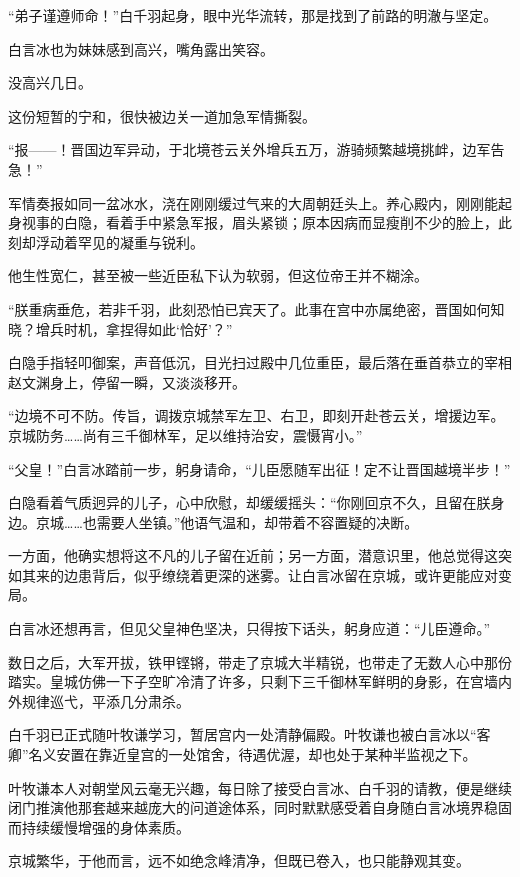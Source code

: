 “弟子谨遵师命！”白千羽起身，眼中光华流转，那是找到了前路的明澈与坚定。

白言冰也为妹妹感到高兴，嘴角露出笑容。

\vspace{2em}

没高兴几日。

这份短暂的宁和，很快被边关一道加急军情撕裂。

“报——！晋国边军异动，于北境苍云关外增兵五万，游骑频繁越境挑衅，边军告急！”

军情奏报如同一盆冰水，浇在刚刚缓过气来的大周朝廷头上。养心殿内，刚刚能起身视事的白隐，看着手中紧急军报，眉头紧锁；原本因病而显瘦削不少的脸上，此刻却浮动着罕见的凝重与锐利。

他生性宽仁，甚至被一些近臣私下认为软弱，但这位帝王并不糊涂。

“朕重病垂危，若非千羽，此刻恐怕已宾天了。此事在宫中亦属绝密，晋国如何知晓？增兵时机，拿捏得如此‘恰好’？”

白隐手指轻叩御案，声音低沉，目光扫过殿中几位重臣，最后落在垂首恭立的宰相赵文渊身上，停留一瞬，又淡淡移开。

“边境不可不防。传旨，调拨京城禁军左卫、右卫，即刻开赴苍云关，增援边军。京城防务……尚有三千御林军，足以维持治安，震慑宵小。”

“父皇！”白言冰踏前一步，躬身请命，“儿臣愿随军出征！定不让晋国越境半步！”

白隐看着气质迥异的儿子，心中欣慰，却缓缓摇头：“你刚回京不久，且留在朕身边。京城……也需要人坐镇。”他语气温和，却带着不容置疑的决断。

一方面，他确实想将这不凡的儿子留在近前；另一方面，潜意识里，他总觉得这突如其来的边患背后，似乎缭绕着更深的迷雾。让白言冰留在京城，或许更能应对变局。

白言冰还想再言，但见父皇神色坚决，只得按下话头，躬身应道：“儿臣遵命。”

数日之后，大军开拔，铁甲铿锵，带走了京城大半精锐，也带走了无数人心中那份踏实。皇城仿佛一下子空旷冷清了许多，只剩下三千御林军鲜明的身影，在宫墙内外规律巡弋，平添几分肃杀。

白千羽已正式随叶牧谦学习，暂居宫内一处清静偏殿。叶牧谦也被白言冰以“客卿”名义安置在靠近皇宫的一处馆舍，待遇优渥，却也处于某种半监视之下。

叶牧谦本人对朝堂风云毫无兴趣，每日除了接受白言冰、白千羽的请教，便是继续闭门推演他那套越来越庞大的问道途体系，同时默默感受着自身随白言冰境界稳固而持续缓慢增强的身体素质。

京城繁华，于他而言，远不如绝念峰清净，但既已卷入，也只能静观其变。

